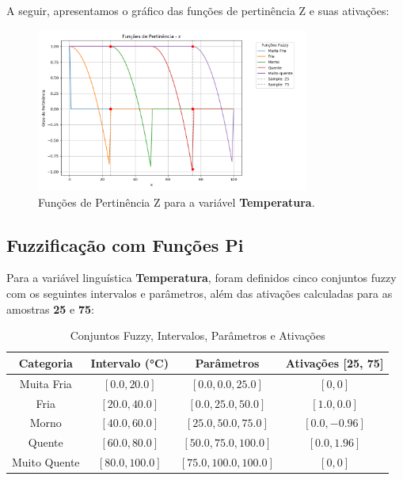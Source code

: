 \documentclass[a4paper,12pt]{article}
\begin{document}
A seguir, apresentamos o gráfico das funções de pertinência Z e suas ativações:

\begin{figure}[H]
    \centering
    \includegraphics[width=0.8\textwidth]{img/funções_de_pertinência_z_fuzzificado.png}
    \caption{Funções de Pertinência Z para a variável \textbf{Temperatura}.}
\end{figure}

\subsection{Fuzzificação com Funções Pi}

Para a variável linguística \textbf{Temperatura}, foram definidos cinco conjuntos fuzzy com os seguintes intervalos e parâmetros, além das ativações calculadas para as amostras \textbf{25} e \textbf{75}:

\begin{table}[H]
\centering
\caption{Conjuntos Fuzzy, Intervalos, Parâmetros e Ativações}
\begin{tabular}{|c|c|c|c|}
\hline
\textbf{Categoria}    & \textbf{Intervalo (°C)} & \textbf{Parâmetros}       & \textbf{Ativações [25, 75]} \\ \hline
Muita Fria            & $[0.0, 20.0]$          & $[0.0, 0.0, 25.0]$        & $[0, 0]$                   \\ \hline
Fria                  & $[20.0, 40.0]$         & $[0.0, 25.0, 50.0]$       & $[1.0, 0.0]$               \\ \hline
Morno                 & $[40.0, 60.0]$         & $[25.0, 50.0, 75.0]$      & $[0.0, -0.96]$             \\ \hline
Quente                & $[60.0, 80.0]$         & $[50.0, 75.0, 100.0]$     & $[0.0, 1.96]$              \\ \hline
Muito Quente          & $[80.0, 100.0]$        & $[75.0, 100.0, 100.0]$    & $[0, 0]$                   \\ \hline
\end{tabular}
\end{table}
\end{document}
